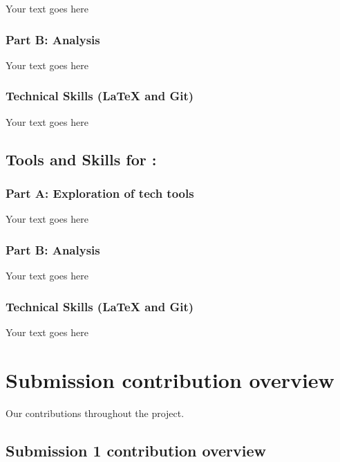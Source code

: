 \documentclass[a4paper, 11pt]{report}
\begin{document}
Your text goes here

\subsubsection{Part B: Analysis}

Your text goes here

\subsubsection{Technical Skills (LaTeX and Git)}

Your text goes here



\subsection{Tools and Skills for \majD: \studD}

\subsubsection{Part A: Exploration of tech tools}

Your text goes here

\subsubsection{Part B: Analysis}

Your text goes here

\subsubsection{Technical Skills (LaTeX and Git)}

Your text goes here



\newpage
\section{Submission contribution overview}
Our contributions throughout the project.

\subsection{Submission 1 contribution overview}
\end{document}

